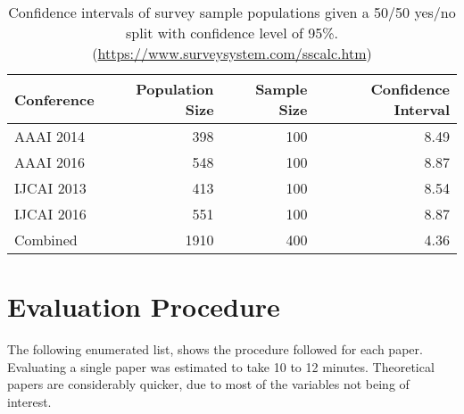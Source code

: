 \begin{table}[!htb]
\begin{center}
    \begin{tabular}{  l | r  r  r }
    \textbf{Conference} & \textbf{Population Size} & \textbf{Sample Size} & \textbf{Confidence Interval} \\ \hline
    AAAI 2014 & 398 & 100 & 8.49 \\
    AAAI 2016 & 548 & 100 & 8.87 \\
    IJCAI 2013 & 413 & 100 & 8.54 \\
    IJCAI 2016 & 551 & 100 & 8.87 \\ \hline
    Combined & 1910 & 400 & 4.36 \\
    \end{tabular}
\end{center}
\caption[Confidence intervals of survey sample populations.]{Confidence intervals of survey sample populations given a 50/50 yes/no split with confidence level of 95\%. (\url{https://www.surveysystem.com/sscalc.htm})}
\label{tab:survey-confidence}
\end{table}

\section{Evaluation Procedure}
\label{sec:evaluation-procedure}
The following enumerated list, shows the procedure followed for each paper. Evaluating a single paper was estimated to take 10 to 12 minutes. Theoretical papers are considerably quicker, due to most of the variables not being of interest.

